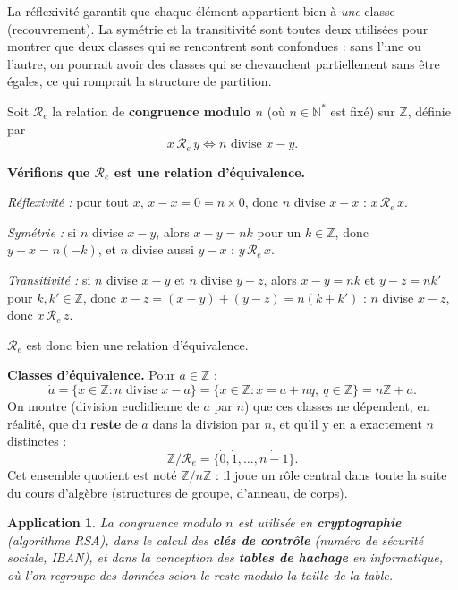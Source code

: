 \documentclass[a4paper,12pt,openany]{book}
\newtheorem{application}{Application}[section]
\begin{document}
\begin{remarque}
La réflexivité garantit que chaque élément appartient bien à \emph{une}
classe (recouvrement). La symétrie et la transitivité sont toutes deux
utilisées pour montrer que deux classes qui se rencontrent sont confondues :
sans l'une ou l'autre, on pourrait avoir des classes qui se chevauchent
partiellement sans être égales, ce qui romprait la structure de partition.
\end{remarque}

\begin{exemple}
Soit $\mathcal{R}_e$ la relation de \textbf{congruence modulo $n$}
(où $n \in \mathbb{N}^*$ est fixé) sur $\mathbb{Z}$, définie par
\[
x\,\mathcal{R}_e\,y \iff n \text{ divise } x-y.
\]

\textbf{Vérifions que $\mathcal{R}_e$ est une relation d'équivalence.}

\textit{Réflexivité :} pour tout $x$, $x-x=0=n\times 0$, donc $n$ divise
$x-x$ : $x\,\mathcal{R}_e\,x$.

\textit{Symétrie :} si $n$ divise $x-y$, alors $x-y=nk$ pour un
$k\in\mathbb{Z}$, donc $y-x = n(-k)$, et $n$ divise aussi $y-x$ :
$y\,\mathcal{R}_e\,x$.

\textit{Transitivité :} si $n$ divise $x-y$ et $n$ divise $y-z$, alors
$x-y=nk$ et $y-z=nk'$ pour $k,k'\in\mathbb{Z}$, donc
$x-z=(x-y)+(y-z)=n(k+k')$ : $n$ divise $x-z$, donc $x\,\mathcal{R}_e\,z$.

$\mathcal{R}_e$ est donc bien une relation d'équivalence.

\textbf{Classes d'équivalence.} Pour $a \in \mathbb{Z}$ :
\[
\dot a = \{x \in \mathbb{Z} : n \text{ divise } x-a\} = \{x \in \mathbb{Z} :
x = a+nq,\ q\in\mathbb{Z}\} = n\mathbb{Z}+a.
\]
On montre (division euclidienne de $a$ par $n$) que ces classes ne dépendent,
en réalité, que du \textbf{reste} de $a$ dans la division par $n$, et qu'il y
en a exactement $n$ distinctes :
\[
\mathbb{Z}/\mathcal{R}_e = \{\dot 0, \dot 1, \dots, \dot{n-1}\}.
\]
Cet ensemble quotient est noté $\mathbb{Z}/n\mathbb{Z}$ : il joue un rôle
central dans toute la suite du cours d'algèbre (structures de groupe,
d'anneau, de corps).
\end{exemple}

\begin{application}
La congruence modulo $n$ est utilisée en \textbf{cryptographie}
(algorithme RSA), dans le calcul des \textbf{clés de contrôle} (numéro de
sécurité sociale, IBAN), et dans la conception des \textbf{tables de
hachage} en informatique, où l'on regroupe des données selon le reste modulo
la taille de la table.
\end{application}
\end{document}

